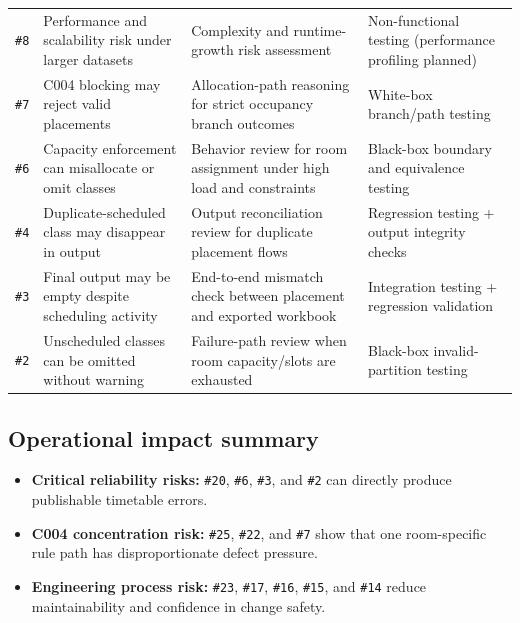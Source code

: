 \documentclass[12pt,a4paper]{article}
\begin{document}
{\begin{longtable}{>{\raggedright\arraybackslash}p{}>{\raggedright\arraybackslash}p{}>{\raggedright\arraybackslash}p{}>{\raggedright\arraybackslash}p{}}
\texttt{\#8} & Performance and scalability risk under larger datasets & Complexity and runtime-growth risk assessment & Non-functional testing (performance profiling planned) \\
\texttt{\#7} & C004 blocking may reject valid placements & Allocation-path reasoning for strict occupancy branch outcomes & White-box branch/path testing \\
\texttt{\#6} & Capacity enforcement can misallocate or omit classes & Behavior review for room assignment under high load and constraints & Black-box boundary and equivalence testing \\
\texttt{\#4} & Duplicate-scheduled class may disappear in output & Output reconciliation review for duplicate placement flows & Regression testing + output integrity checks \\
\texttt{\#3} & Final output may be empty despite scheduling activity & End-to-end mismatch check between placement and exported workbook & Integration testing + regression validation \\
\texttt{\#2} & Unscheduled classes can be omitted without warning & Failure-path review when room capacity/slots are exhausted & Black-box invalid-partition testing \\
\bottomrule
\end{longtable}
}

\subsection{Operational impact summary}
\begin{itemize}[leftmargin=1.2cm]
  \item \textbf{Critical reliability risks:} \texttt{\#20}, \texttt{\#6}, \texttt{\#3}, and \texttt{\#2} can directly produce publishable timetable errors.
  \item \textbf{C004 concentration risk:} \texttt{\#25}, \texttt{\#22}, and \texttt{\#7} show that one room-specific rule path has disproportionate defect pressure.
  \item \textbf{Engineering process risk:} \texttt{\#23}, \texttt{\#17}, \texttt{\#16}, \texttt{\#15}, and \texttt{\#14} reduce maintainability and confidence in change safety.
\end{itemize}
\end{document}
